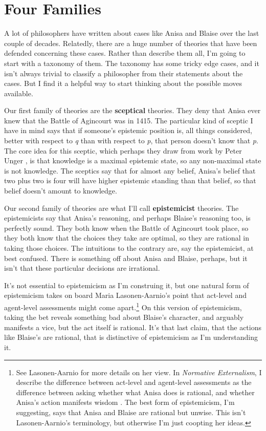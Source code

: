 \documentclass[
  11pt,
]{book}
\begin{document}
\hypertarget{fourfamilies}{%
\section{Four Families}\label{fourfamilies}}

A lot of philosophers have written about cases like Anisa and Blaise over the last couple of decades. Relatedly, there are a huge number of theories that have been defended concerning these cases. Rather than describe them all, I'm going to start with a taxonomy of them. The taxonomy has some tricky edge cases, and it isn't always trivial to classify a philosopher from their statements about the cases. But I find it a helpful way to start thinking about the possible moves available.

Our first family of theories are the \textbf{sceptical} theories. They deny that Anisa ever knew that the Battle of Agincourt was in 1415. The particular kind of sceptic I have in mind says that if someone's epistemic position is, all things considered, better with respect to \emph{q} than with respect to \emph{p}, that person doesn't know that \emph{p}. The core idea for this sceptic, which perhaps they draw from work by Peter Unger \citeyearpar{Unger1975}, is that knowledge is a maximal epistemic state, so any non-maximal state is not knowledge. The sceptics say that for almost any belief, Anisa's belief that two plus two is four will have higher epistemic standing than that belief, so that belief doesn't amount to knowledge.

Our second family of theories are what I'll call \textbf{epistemicist} theories. The epistemicists say that Anisa's reasoning, and perhaps Blaise's reasoning too, is perfectly sound. They both know when the Battle of Agincourt took place, so they both know that the choices they take are optimal, so they are rational in taking those choices. The intuitions to the contrary are, say the epistemicist, at best confused. There is something off about Anisa and Blaise, perhaps, but it isn't that these particular decisions are irrational.

It's not essential to epistemicism as I'm construing it, but one natural form of epistemicism takes on board Maria Lasonen-Aarnio's point that act-level and agent-level assessments might come apart.\footnote{See Lasonen-Aarnio \citetext{\citeyear{Lasonen-Aarnio2010b}; \citeyear{Lasonen-Aarnio2014}} for more details on her view. In \emph{Normative Externalism}, I describe the difference between act-level and agent-level assessments as the difference between asking whether what Anisa does is rational, and whether Anisa's action manifests wisdom \citep[124-5]{Weatherson2019}. The best form of epistemicism, I'm suggesting, says that Anisa and Blaise are rational but unwise. This isn't Lasonen-Aarnio's terminology, but otherwise I'm just coopting her ideas.} On this version of epistemicism, taking the bet reveals something bad about Blaise's character, and arguably manifests a vice, but the act itself is rational. It's that last claim, that the actions like Blaise's are rational, that is distinctive of epistemicism as I'm understanding it.
\end{document}
